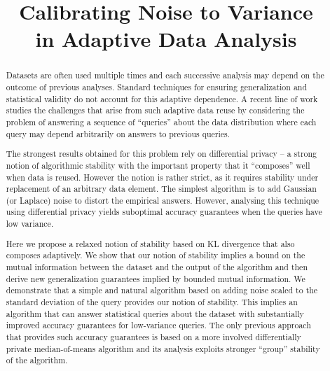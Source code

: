 \documentclass[final,12pt]{colt2018}
\title[Calibrating Noise to Variance in Adaptive Data Analysis]{Calibrating Noise to Variance\\in Adaptive Data Analysis}
\begin{document}
\maketitle


\begin{abstract}
Datasets are often used multiple times and each successive analysis may depend on the outcome of previous analyses. Standard techniques for ensuring generalization and statistical validity do not account for this adaptive dependence. A recent line of work studies the challenges that arise from such adaptive data reuse by considering the problem of answering a sequence of ``queries'' about the data distribution where each query may depend arbitrarily on answers to previous queries.

The strongest results obtained for this problem rely on differential privacy -- a strong notion of algorithmic stability with the important property that it ``composes'' well when data is reused. However the notion is rather strict, as it requires stability under replacement of an arbitrary data element. The simplest algorithm is to add Gaussian (or Laplace) noise to distort the empirical answers. However, analysing this technique using differential privacy yields suboptimal accuracy guarantees when the queries have low variance.

Here we propose a relaxed notion of stability based on KL divergence that also composes adaptively. We show that our notion of stability implies a bound on the mutual information between the dataset and the output of the algorithm and then derive new generalization guarantees implied by bounded mutual information. We demonstrate that a simple and natural algorithm based on adding noise scaled to the standard deviation of the query provides our notion of stability. This implies an algorithm that can answer statistical queries about the dataset with substantially improved accuracy guarantees for low-variance queries. The only previous approach that provides such accuracy guarantees is based on a more involved differentially private median-of-means algorithm and its analysis exploits stronger ``group'' stability of the algorithm.
\end{abstract}

\end{document}
